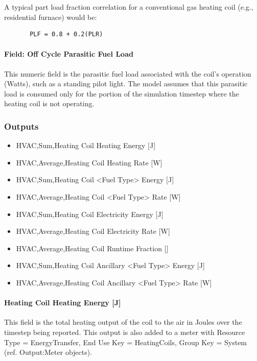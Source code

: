 A typical part load fraction correlation for a conventional gas heating coil (e.g., residential furnace) would be:

\begin{lstlisting}
       PLF = 0.8 + 0.2(PLR)
\end{lstlisting}

\paragraph{Field: Off Cycle Parasitic Fuel Load}\label{field-parasitic-gas-load}

This numeric field is the parasitic fuel load associated with the coil's operation (Watts), such as a standing pilot light. The model assumes that this parasitic load is consumed only for the portion of the simulation timestep where the heating coil is not operating.

\subsubsection{Outputs}\label{outputs-9-002}

\begin{itemize}
\item
  HVAC,Sum,Heating Coil Heating Energy {[}J{]}
\item
  HVAC,Average,Heating Coil Heating Rate {[}W{]}
\item
  HVAC,Sum,Heating Coil <Fuel Type> Energy {[}J{]}
\item
  HVAC,Average,Heating Coil <Fuel Type> Rate {[}W{]}
\item
  HVAC,Sum,Heating Coil Electricity Energy {[}J{]}
\item
  HVAC,Average,Heating Coil Electricity Rate {[}W{]}
\item
  HVAC,Average,Heating Coil Runtime Fraction {[]}
\item
  HVAC,Sum,Heating Coil Ancillary <Fuel Type> Energy {[}J{]}
\item
  HVAC,Average,Heating Coil Ancillary <Fuel Type> Rate {[}W{]}
\end{itemize}

\paragraph{Heating Coil Heating Energy {[}J{]}}\label{heating-coil-heating-energy-j-6}

This field is the total heating output of the coil to the air in Joules over the timestep being reported. This output is also added to a meter with Resource Type = EnergyTransfer, End Use Key = HeatingCoils, Group Key = System (ref. Output:Meter objects).

